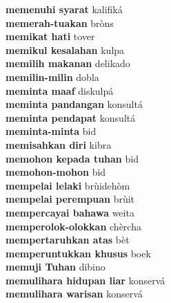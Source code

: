 \textbf{ memenuhi syarat  } kalifiká \\
\textbf{ memerah-tuakan  } bròns \\
\textbf{ memikat hati  } tover \\
\textbf{ memikul kesalahan  } kulpa \\
\textbf{ memilih makanan  } delikado \\
\textbf{ memilin-milin  } dobla \\
\textbf{ meminta maaf  } diskulpá \\
\textbf{ meminta pandangan  } konsultá \\
\textbf{ meminta pendapat  } konsultá \\
\textbf{ meminta-minta  } bid \\
\textbf{ memisahkan diri  } kibra \\
\textbf{ memohon kepada tuhan  } bid \\
\textbf{ memohon-mohon  } bid \\
\textbf{ mempelai lelaki  } brùidehòm \\
\textbf{ mempelai perempuan  } brùit \\
\textbf{ mempercayai bahawa  } weita \\
\textbf{ memperolok-olokkan  } chèrcha \\
\textbf{ mempertaruhkan atas  } bèt \\
\textbf{ memperuntukkan khusus  } boek \\
\textbf{ memuji Tuhan  } dibino \\
\textbf{ memulihara hidupan liar  } konservá \\
\textbf{ memulihara warisan  } konservá \\
